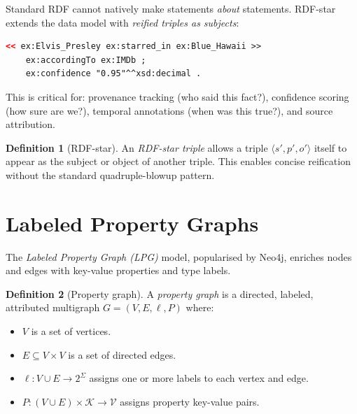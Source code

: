 \documentclass[11pt,a4paper,oneside,openany]{book}
\theoremstyle{definition}
\newtheorem{definition}{Definition}[chapter]
\theoremstyle{plain}
\theoremstyle{remark}
\begin{document}
Standard RDF cannot natively make statements \emph{about} statements. RDF-star extends the data model with \emph{reified triples as subjects}:

\begin{lstlisting}[language=XML,numbers=none]
<< ex:Elvis_Presley ex:starred_in ex:Blue_Hawaii >>
    ex:accordingTo ex:IMDb ;
    ex:confidence "0.95"^^xsd:decimal .
\end{lstlisting}

This is critical for: provenance tracking (who said this fact?), confidence scoring (how sure are we?), temporal annotations (when was this true?), and source attribution.

\begin{definition}[RDF-star]
	An \emph{RDF-star triple} allows a triple $\langle s', p', o' \rangle$ itself to appear as the subject or object of another triple. This enables concise reification without the standard quadruple-blowup pattern.
\end{definition}

\section{Labeled Property Graphs}\label{sec:lpg}

The \emph{Labeled Property Graph (LPG)} model, popularised by Neo4j, enriches nodes and edges with key-value properties and type labels.

\begin{definition}[Property graph]
	A \emph{property graph} is a directed, labeled, attributed multigraph $G = (V, E, \ell, P)$ where:
	\begin{itemize}
		\item $V$ is a set of vertices.
		\item $E \subseteq V \times V$ is a set of directed edges.
		\item $\ell: V \cup E \to 2^{\Sigma}$ assigns one or more labels to each vertex and edge.
		\item $P: (V \cup E) \times \mathcal{K} \to \mathcal{V}$ assigns property key-value pairs.
	\end{itemize}
\end{definition}
\end{document}
